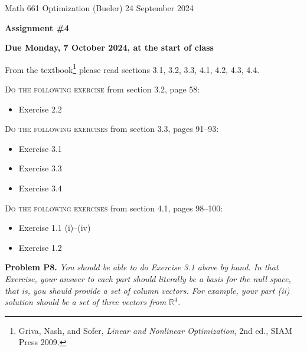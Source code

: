 \documentclass[12pt]{amsart}
\newcommand{\RR}{\mathbb{R}}
\newcommand{\prob}[1]{\bigskip\noindent\textbf{#1}\quad }
\begin{document}
\scriptsize \noindent Math 661 Optimization (Bueler) \hfill 24 September 2024
\normalsize

\medskip\bigskip

\Large\centerline{\textbf{Assignment \#4}}
\large
\bigskip

\centerline{\textbf{Due Monday, 7 October 2024, at the start of class}}
\bigskip
\normalsize

\thispagestyle{empty}

\bigskip
\noindent From the textbook\footnote{Griva, Nash, and Sofer, \emph{Linear and Nonlinear Optimization}, 2nd ed., SIAM Press 2009.} please read sections 3.1, 3.2, 3.3, 4.1, 4.2, 4.3, 4.4.

\bigskip
\noindent \textsc{Do the following exercise} from section 3.2, page 58:

\begin{itemize}
\item Exercise 2.2
\end{itemize}

\bigskip
\noindent \textsc{Do the following exercises} from section 3.3, pages 91--93:

\begin{itemize}
\item Exercise 3.1
\item Exercise 3.3
\item Exercise 3.4
\end{itemize}

\bigskip
\noindent \textsc{Do the following exercises} from section 4.1, pages 98--100:

\begin{itemize}
\item Exercise 1.1 (i)--(iv)
\item Exercise 1.2
\end{itemize}

\prob{Problem P8.}  \emph{You should be able to do Exercise 3.1 above by hand.   In that Exercise, your answer to each part should literally be a \emph{basis} for the null space, that is, you should provide a set of column vectors.  For example, your part (ii) solution should be a set of three vectors from $\RR^4$.}
\end{document}
